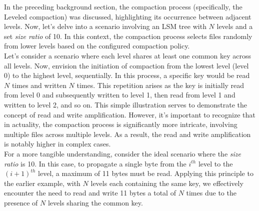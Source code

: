 In the preceding background section, the compaction process (specifically, the Leveled compaction) was discussed, 
highlighting its occurrence between adjacent levels. Now, let's delve into a scenario involving an LSM tree with $N$ 
levels and a set \textit{size ratio} of 10. In this context, the compaction process selects files randomly from lower 
levels based on the configured compaction policy.\\
Let's consider a scenario where each level shares at least one common key across all levels. Now, envision the 
initiation of compaction from the lowest level (level 0) to the highest level, sequentially. In this process, a 
specific key would be read $N$ times and written $N$ times. This repetition arises as the key is initially read from 
level 0 and subsequently written to level 1, then read from level 1 and written to level 2, and so on. This simple 
illustration serves to demonstrate the concept of read and write amplification. However, it's important to recognize 
that in actuality, the compaction process is significantly more intricate, involving multiple files across multiple 
levels. As a result, the read and write amplification is notably higher in complex cases.\\
For a more tangible understanding, consider the ideal scenario where the \textit{size ratio} is 10. In this case, to 
propagate a single byte from the $i^{th}$ level to the $(i+1)^{th}$ level, a maximum of 11 bytes must be read.
Applying this principle to the earlier example, with $N$ levels each containing the same key, we effectively encounter 
the need to read and write 11 bytes a total of $N$ times due to the presence of $N$ levels sharing the common key.